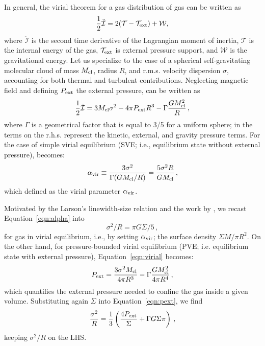 \IfFileExists{emulateapjlegacy.cls}{\documentclass[iop]{emulateapjlegacy}}{\documentclass[iop]{emulateapj}}
\begin{document}
In general, the virial theorem for a gas distribution of gas can be written as
\begin{equation}\label{eqn:virial_th_general}
\frac{1}{2}\ddot{\mathcal{I}} = 2(\mathcal{T} - \mathcal{T}_{\rm ext}) + \mathcal{W},
\end{equation}
where $\ddot{\mathcal{I}}$ is the second time derivative of the Lagrangian moment of inertia, $\mathcal{T}$ is the internal energy of the gas, $\mathcal{T}_{\rm ext}$ is external pressure support, and $\mathcal{W}$ is the gravitational energy.
%
Let us specialize to the case of a spherical self-gravitating molecular cloud of mass $M_{\rm cl}$, radius $R$, and r.m.s. velocity dispersion $\sigma$, accounting for both thermal and turbulent contributions. Neglecting magnetic field and defining $P_{\rm ext}$ the external pressure,  can be written as
\begin{equation}
\frac{1}{2}{\ddot{\mathcal{I}}} = 3 M_{\rm cl} \sigma^2 - 4\pi P_{\rm ext} R^3 - \Gamma\frac{GM_{\rm cl}^2}{R}\,,
\label{eqn:virial}
\end{equation}
where $\Gamma$ is a geometrical factor that is equal to 3/5 for a uniform sphere; in  the terms on the r.h.s. represent the kinetic, external, and gravity pressure terms. 
%
For the case of simple virial equilibrium (SVE; i.e., equilibrium state without external pressure),  becomes:
\begin{equation}
\alpha_{\rm vir} \equiv \frac{3\sigma^2}{\Gamma (GM_{\rm cl}/R)} = \frac{5\sigma^2R}{GM_{\rm cl}}\,,
\label{eqn:alpha}
\end{equation}
which defined as the virial parameter $\alpha_{\rm vir}$.

Motivated by the Larson's linewidth-size relation \citep{Larson81a} and the work by \citet{Heyer09a}, we recast Equation~\ref{eqn:alpha} into 
\begin{equation}
\sigma^2/R = \pi G \Sigma/5\,,
\label{eqn:SVE}
\end{equation}
for gas in virial equilibrium, i.e., by setting $\alpha_{\rm vir}$; the surface density $\Sigma$\eq$M/\pi R^2$. On the other hand, for pressure-bounded virial equilibrium (PVE; i.e. equilibrium state with external pressure), Equation~\ref{eqn:virial} becomes:
\begin{equation}
P_{\rm ext} = \frac{3\sigma^2M_{\rm cl}}{4\pi R^3} - \Gamma\frac{G M_{\rm cl}^2}{4\pi R^4}\,,
\label{eqn:pext}
\end{equation}
which quantifies the external pressure needed to confine the gas inside a given volume. Substituting again $\Sigma$  into Equation~\ref{eqn:pext}, we find 
\begin{equation}
\frac{\sigma^2}{R} = \frac{1}{3}\left(\frac{4P_{\rm ext}}{\Sigma} + \Gamma G \Sigma \pi \right)\,,
\label{eqn:v0}
\end{equation}
keeping $\sigma^2/R$ on the LHS.
\end{document}
